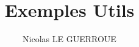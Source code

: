 




\title{Exemples Utils}
\author{Nicolas LE GUERROUE}
\maketitle
\tableofcontents
\newpage












